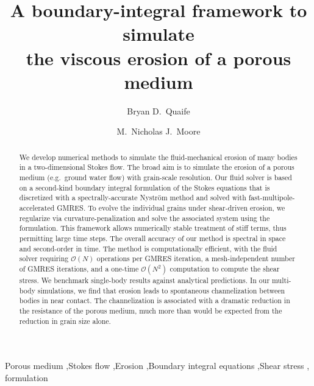 \documentclass[preprint, 10pt]{elsarticle}
\begin{document}
\title{A boundary-integral framework to simulate \\ the viscous erosion of a porous medium}



\author[Bryan]{Bryan D.~Quaife}
\author[Nick]{M.~Nicholas J.~Moore}
\address[Nick]{Department of Mathematics and Geophysical Fluid Dynamics Institute, Florida State University, Tallahassee, FL, 32306.}
\address[Bryan]{Department of Scientific Computing and Geophysical Fluid Dynamics Institute, Florida State University, Tallahassee, FL, 32306.}

\begin{abstract} 
We develop numerical methods to simulate the fluid-mechanical erosion of many bodies in a two-dimensional Stokes flow. The broad aim is to simulate the erosion of a porous medium (e.g.~ground water flow) with grain-scale resolution. Our fluid solver is based on a second-kind boundary integral formulation of the Stokes equations that is discretized with a spectrally-accurate Nystr\"om method and solved with fast-multipole-accelerated GMRES. To evolve the individual grains under shear-driven erosion, we regularize via curvature-penalization and solve the associated system using the {\thL} formulation. This framework allows numerically stable treatment of stiff terms, thus permitting large time
steps. The overall accuracy of our method is spectral in space and second-order in time. The method is computationally efficient, with the fluid solver requiring $\mathcal{O}(N)$ operations per GMRES iteration, a mesh-independent number of GMRES iterations, and a one-time $\mathcal{O}(N^2)$ computation to compute the shear stress. We benchmark single-body results against analytical predictions. In our multi-body simulations, we find that erosion leads to spontaneous channelization between bodies in near contact. The channelization is associated with a dramatic reduction in the resistance of the porous medium, much more than would be expected from the reduction in grain size alone.
\end{abstract}

\begin{keyword}
  Porous medium \sep Stokes flow \sep Erosion \sep Boundary integral
  equations \sep Shear stress \sep {\thL} formulation
\end{keyword}
\end{document}
